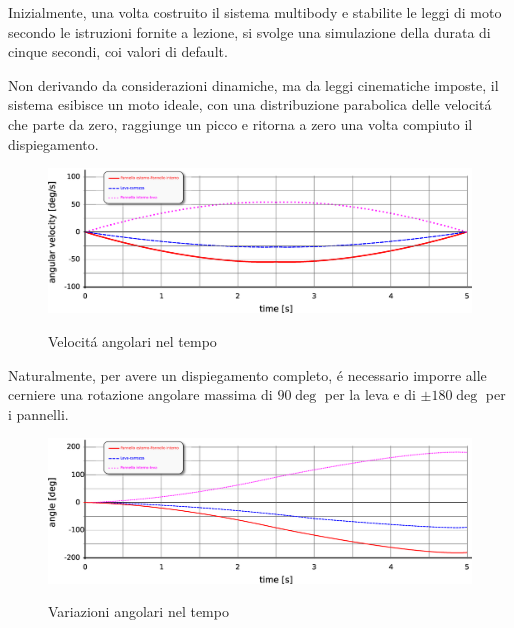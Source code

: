 \documentclass{article}
\begin{document}
        \clearpage 

        Inizialmente, una volta costruito il sistema multibody e stabilite le leggi di moto secondo le istruzioni
        fornite a lezione, si svolge una simulazione della durata di cinque secondi, coi valori di default.

        Non derivando da considerazioni dinamiche, ma da leggi cinematiche imposte, il sistema esibisce
        un moto ideale, con una distribuzione parabolica delle velocitá che parte da zero, raggiunge un picco e ritorna a zero
        una volta compiuto il dispiegamento.

            \begin{figure}[h!]
                \centering
                 \label{fig:angular_velocity}
                \includegraphics[width=\textwidth]{MUL2/Esercitazione4/analisi_cinematica_ang_velocity.eps}
                \caption{Velocitá angolari nel tempo}
            \end{figure}

            Naturalmente, per avere un dispiegamento completo, é necessario imporre alle cerniere 
            una rotazione angolare massima di $90 \deg$ per la leva e di $\pm 180 \deg$ per i pannelli.

            \begin{figure}[h!]
                \centering
                 \label{fig:angular_velocity}
                \includegraphics[width=\textwidth]{MUL2/Esercitazione4/analisi_cinematica_angle.eps}
                \caption{Variazioni angolari nel tempo}
            \end{figure}
        \clearpage
\end{document}
